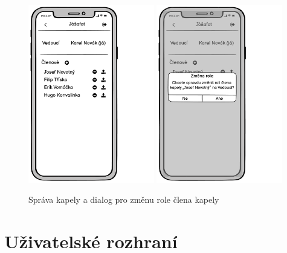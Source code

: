 \begin{figure}
    \includegraphics[width=0.49\textwidth]{images/B-navrh-ui/B-6-sprava-kapely.pdf}
    \includegraphics[width=0.49\textwidth]{images/B-navrh-ui/B-6-zmena-role.pdf}
    \caption{Správa kapely a dialog pro změnu role člena kapely}
\end{figure}

\chapter{Uživatelské rozhraní}

